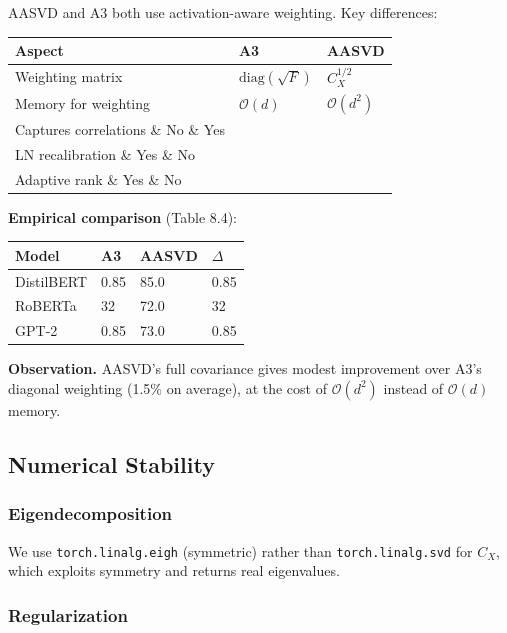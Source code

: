 AASVD and A3 both use activation-aware weighting. Key differences:

\begin{table}[H]
\centering
\small
\begin{tabular}{lll}
\toprule
\textbf{Aspect} & \textbf{A3} & \textbf{AASVD} \\
\midrule
Weighting matrix & $\mathrm{diag}(\sqrt{F})$ & $C_X^{1/2}$ \\
Memory for weighting & $\mathcal{O}(d)$ & $\mathcal{O}(d^2)$ \\
Captures correlations \& No \& Yes \\
LN recalibration \& Yes \& No \\
Adaptive rank \& Yes \& No \\
\bottomrule
\end{tabular}
\end{table}

\textbf{Empirical comparison} (Table 8.4):

\begin{table}[H]
\centering
\small
\begin{tabular}{llll}
\toprule
\textbf{Model} & \textbf{A3} & \textbf{AASVD} & \textbf{$\Delta$} \\
\midrule
DistilBERT & 0.85 & 85.0 & 0.85 \\
RoBERTa & 32 & 72.0 & 32 \\
GPT-2 & 0.85 & 73.0 & 0.85 \\
\bottomrule
\end{tabular}
\end{table}

\textbf{Observation.} AASVD's full covariance gives modest improvement over A3's 
diagonal weighting (1.5\% on average), at the cost of 
$\mathcal{O}(d^2)$ instead of $\mathcal{O}(d)$ memory.

\subsection{Numerical Stability}

\subsubsection{Eigendecomposition}

We use \texttt{torch.linalg.eigh} (symmetric) rather than \texttt{torch.linalg.svd} for 
$C_X$, which exploits symmetry and returns real eigenvalues.

\subsubsection{Regularization}

